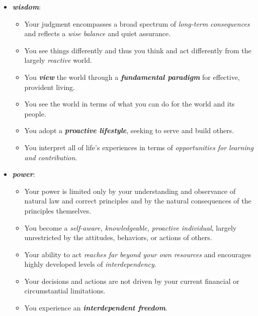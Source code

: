 \documentclass[11pt]{article}
\begin{document}
\begin{itemize}
\begin{itemize}
\item \emph{\textbf{wisdom}}:
\begin{itemize}
\item Your judgment encompasses a broad spectrum of \emph{long-term consequences} and reflects a \emph{wise balance} and quiet assurance.
\item You see things differently and thus you think and act differently from the largely \emph{reactive} world.
\item You \emph{\textbf{view}} the world through a \emph{\textbf{fundamental paradigm}} for effective, provident living.
\item You see the world in terms of what you can do for the world and its people.
\item You adopt a \emph{\textbf{proactive lifestyle}}, seeking to serve and build others.
\item You interpret all of life's experiences in terms of \emph{opportunities for learning and contribution}.
\end{itemize}

\item \emph{\textbf{power}}:
\begin{itemize}
\item Your power is limited only by your understanding and observance of natural law and correct principles and by the natural consequences of the principles themselves.
\item You become a \emph{self-aware, knowledgeable, proactive individual}, largely unrestricted by the attitudes, behaviors, or actions of others.
\item Your ability to act \emph{reaches far beyond your own resources} and encourages highly developed levels of \emph{interdependency}.
\item Your decisions and actions are not driven by your current financial or circumstantial limitations.
\item You experience an \emph{\textbf{interdependent freedom}}.
\end{itemize}
\end{itemize}
\end{itemize}
\end{document}
